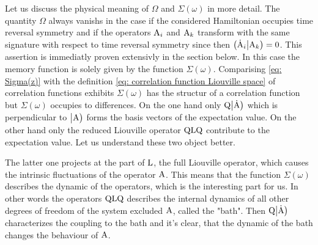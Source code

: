 Let us discuss the physical meaning of $\Omega$ and $\Sigma(\omega)$ in more detail.
The quantity $\Omega$ always vanishs in the case if the considered Hamiltonian occupies time reversal symmetry and if the operators $\mathrm{A}_{i}$ and $\mathrm{A}_{k}$ transform with the same signature with respect to time reversal symmetry since then $\big({\dot{\mathrm{A}}_{i}}\big|{\mathrm{A}_{k}}\big) = 0$.
This assertion is immediatly proven extensivly in the section below.
In this case the memory function is solely given by the function $\Sigma(\omega)$.
Comparising \eqref{eq: Sigma(z)} with the definition \eqref{eq: correlation function Liouville space} of correlation functions  exhibits $\Sigma(\omega)$ has the structur of a correlation function but $\Sigma(\omega)$ occupies to differences.
On the one hand only $\mathrm{Q} \big|{\dot{\mathrm{A}}}\big)$ which is perpendicular to $\big|{\mathrm{A}}\big)$ forms the basis vectors of the expectation value.
On the other hand only the reduced Liouville operator $\mathrm{QLQ}$ contribute to the expectation value.
Let us understand these two object better.

The latter one projects at the part of $\mathrm{L}$, the full Liouville operator, which causes the intrinsic fluctuations of the operator $\mathrm{A}$.
This means that the function $\Sigma(\omega)$ describes the dynamic of the operators, which is the interesting part for us.
In other words the operators $\mathrm{QLQ}$ describes the internal dynamics of all other degrees of freedom of the system excluded $\mathrm{A}$, called the "bath".
Then $\mathrm{Q} \big|{\dot{\mathrm{A}}}\big)$ characterizes the coupling to the bath and it's clear, that the dynamic of the bath changes the behaviour of $\mathrm{A}$.
%
%
